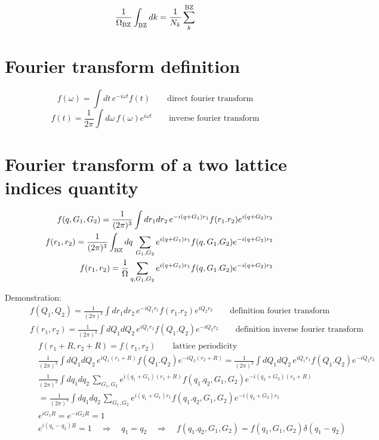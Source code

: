 \documentclass[fleqn]{article}
\begin{document}
\[
\frac{1}{\Omega_{\rm BZ}} \int_{\rm BZ} dk = \frac{1}{N_k} \sum_k^{\rm BZ}
\]

\section{Fourier transform definition}

\[
  f(\omega) = \int dt \, e^{-i\omega t} f(t)
  \qquad \textrm{direct fourier transform}
\]
\[
  f(t) = \frac{1}{2\pi} \int d\omega \, f(\omega) e^{i\omega t} 
  \qquad \textrm{inverse fourier transform}
\]

\newpage

\section{Fourier transform of a two lattice indices quantity}

\begin{eqnarray*}
&&
f(q,G_1,G_2) = \frac{1}{(2 \pi)^3} \int dr_1 dr_2 \, e^{-i (q+G_1) r_1} f(r_1.r_2) e^{i (q+G_2) r_2}
\\ &&
f(r_1,r_2) = \frac{1}{(2 \pi)^3} \int_{\rm BZ} dq \, \sum_{G_1,G_2}
e^{i (q+G_1) r_1} f(q,G_1.G_2) e^{-i (q+G_2) r_2}
\\ &&
f(r_1,r_2) = \frac{1}{\Omega} \sum_{q,G_1,G_2}
e^{i (q+G_1) r_1} f(q,G_1.G_2) e^{-i (q+G_2) r_2}
\end{eqnarray*}

Demonstration:
\begin{eqnarray*}
\quad &&
f(Q_1,Q_2) = \frac{1}{(2 \pi)^3} \int dr_1 dr_2 \, e^{-i Q_1 r_1} f(r_1.r_2) e^{i Q_2 r_2}
\qquad \textrm{definition fourier transform}
\\ &&
f(r_1,r_2) = \frac{1}{(2 \pi)^3} \int dQ_1 dQ_2 \, e^{i Q_1 r_1} f(Q_1.Q_2) e^{-i Q_2 r_2}
\qquad \textrm{definition inverse fourier transform}
\\ && \quad
f(r_1+R,r_2+R) = f(r_1,r_2)
\qquad \textrm{lattice periodicity}
\\ && \quad
\frac{1}{(2 \pi)^3} \int dQ_1 dQ_2 \, e^{i Q_1 (r_1+R)} f(Q_1.Q_2) e^{-i Q_2 (r_2+R)}
= \frac{1}{(2 \pi)^3} \int dQ_1 dQ_2 \, e^{i Q_1 r_1} f(Q_1.Q_2) e^{-i Q_2 r_2}
\\ && \quad
\frac{1}{(2 \pi)^3} \int dq_1 dq_2 \, \sum_{G_1,G_2}
e^{i (q_1+G_1) (r_1+R)} f(q_1.q_2,G_1,G_2) e^{-i (q_2+G_2) (r_2+R)}
\\ && \quad
= \frac{1}{(2 \pi)^3} \int dq_1 dq_2 \, \sum_{G_1,G_2}
e^{i (q_1+G_1) r_1} f(q_1.q_2,G_1,G_2) e^{-i (q_2+G_2) r_2}
\\ && \quad
e^{i G_1 R} = e^{-i G_2 R} = 1
\\ && \quad
e^{i (q_1 - q_2) R} = 1 \quad \Rightarrow \quad q_1 = q_2
\quad \Rightarrow \quad f(q_1.q_2,G_1,G_2) = f(q_1,G_1,G_2) \delta(q_1-q_2)
\end{eqnarray*}
\end{document}
